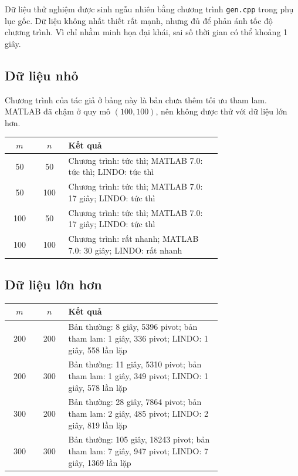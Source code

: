 \documentclass[11pt]{article}
\begin{document}
Dữ liệu thử nghiệm được sinh ngẫu nhiên bằng chương trình \texttt{gen.cpp}
trong phụ lục gốc. Dữ liệu không nhất thiết rất mạnh, nhưng đủ để phản ánh
tốc độ chương trình. Vì chỉ nhằm minh họa đại khái, sai số thời gian có thể
khoảng 1 giây.

\subsection*{Dữ liệu nhỏ}

Chương trình của tác giả ở bảng này là bản chưa thêm tối ưu tham lam. MATLAB
đã chậm ở quy mô $(100,100)$, nên không được thử với dữ liệu lớn hơn.

\begin{center}
\begin{tabular}{c c p{0.72\linewidth}}
\hline
$m$ & $n$ & Kết quả\\
\hline
50 & 50 &
Chương trình: tức thì; MATLAB 7.0: tức thì; LINDO: tức thì\\
50 & 100 &
Chương trình: tức thì; MATLAB 7.0: 17 giây; LINDO: tức thì\\
100 & 50 &
Chương trình: tức thì; MATLAB 7.0: 17 giây; LINDO: tức thì\\
100 & 100 &
Chương trình: rất nhanh; MATLAB 7.0: 30 giây; LINDO: rất nhanh\\
\hline
\end{tabular}
\end{center}

\subsection*{Dữ liệu lớn hơn}

\begin{center}
\begin{tabular}{c c p{0.72\linewidth}}
\hline
$m$ & $n$ & Kết quả\\
\hline
200 & 200 &
Bản thường: 8 giây, 5396 pivot; bản tham lam: 1 giây, 336 pivot; LINDO: 1 giây, 558 lần lặp\\
200 & 300 &
Bản thường: 11 giây, 5310 pivot; bản tham lam: 1 giây, 349 pivot; LINDO: 1 giây, 578 lần lặp\\
300 & 200 &
Bản thường: 28 giây, 7864 pivot; bản tham lam: 2 giây, 485 pivot; LINDO: 2 giây, 819 lần lặp\\
300 & 300 &
Bản thường: 105 giây, 18243 pivot; bản tham lam: 7 giây, 947 pivot; LINDO: 7 giây, 1369 lần lặp\\
\hline
\end{tabular}
\end{center}
\end{document}
